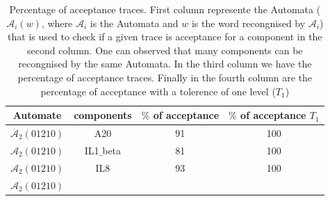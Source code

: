 \begin{table}[!t]
\renewcommand{\arraystretch}{1.3}

\caption{Percentage of acceptance traces. First column represente the Automata ($\mathcal{A}_{i}(w)$, where $\mathcal{A}_{i}$ is the Automata and $w$ is the word recongnised by $\mathcal{A}_{i}$) 
that is used to check if a given trace is acceptance for a component in the second 
column. One can observed that many components can be recongnised by the same Automata. In the third column we have the percentage of acceptance traces. Finally in the fourth column
are the percentage of acceptance with a tolerence of one level ($T_{1}$)}

\label{traceAnalysis}
\centering
\begin{tabular}{|c|c||c|c|}
\hline

\textbf{Automate}

&

\textbf{components}

&

\textbf{$\%$ of acceptance}

&

\textbf{$\%$ of acceptance $T_{1}$}
\\ \hline

$\mathcal{A}_{2}(01210)$

&

A20

&

91

&

100
\\ \hline

$\mathcal{A}_{2}(01210)$

&

IL1$\_$beta

&

81

&

100
\\ \hline

$\mathcal{A}_{2}(01210)$

&

IL8

&

93

&

100

\\ \hline

$\mathcal{A}_{2}(01210)$

&


\end{tabular}
\end{table}
